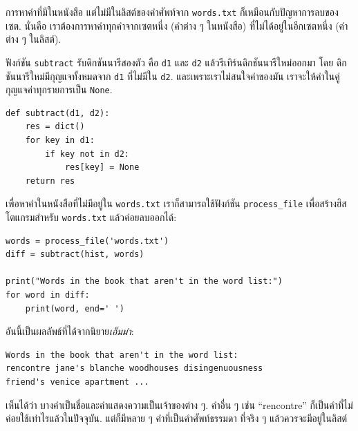 การหาคำที่มีในหนังสือ แต่ไม่มีในลิสต์ของคำศัพท์จาก \texttt{words.txt}
ก็เหมือนกับปัญหาการลบของเซต.
นั่นคือ เราต้องการหาคำทุกคำจากเซตหนึ่ง (คำต่าง ๆ ในหนังสือ) ที่ไม่ได้อยู่ในอีกเซตหนึ่ง (คำต่าง ๆ ในลิสต์).


ฟังก์ชัน \texttt{subtract} รับดิกชันนารีสองตัว คือ \texttt{d1} และ \texttt{d2} 
แล้วรีเทิร์นดิกชันนารีใหม่ออกมา 
โดย ดิกชันนารีใหม่มีกุญแจทั้งหมดจาก \texttt{d1} ที่ไม่มีใน \texttt{d2}.
และเพราะเราไม่สนใจค่าของมัน เราจะให้ค่าในคู่กุญแจค่าทุกรายการเป็น \texttt{None}.

\begin{verbatim}
def subtract(d1, d2):
    res = dict()
    for key in d1:
        if key not in d2:
            res[key] = None
    return res
\end{verbatim}
%
%
เพื่อหาคำในหนังสือที่ไม่มีอยู่ใน \texttt{words.txt}
เราก็สามารถใช้ฟังก์ชัน \verb|process_file| เพื่อสร้างฮิสโตแกรมสำหรับ \texttt{words.txt} แล้วค่อยลบออกได้:

\begin{verbatim}
words = process_file('words.txt')
diff = subtract(hist, words)

print("Words in the book that aren't in the word list:")
for word in diff:
    print(word, end=' ')
\end{verbatim}
%
%
อันนี้เป็นผลลัพธ์ที่ได้จากนิยาย\textit{เอ็มม่า}:

\begin{verbatim}
Words in the book that aren't in the word list:
rencontre jane's blanche woodhouses disingenuousness 
friend's venice apartment ...
\end{verbatim}
%
%
เห็นได้ว่า บางคำเป็นชื่อและคำแสดงความเป็นเจ้าของต่าง ๆ.
คำอื่น ๆ เช่น ``rencontre'' ก็เป็นคำที่ไม่ค่อยใช้เท่าไรแล้วในปัจจุบัน.
แต่ก็มีหลาย ๆ คำที่เป็นคำศัพท์ธรรมดา ที่จริง ๆ แล้วควรจะมีอยู่ในลิสต์

